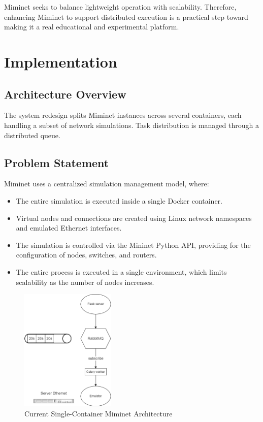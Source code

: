 \documentclass[14pt]{article}
\begin{document}
Miminet\cite{miminet} seeks to balance lightweight operation with scalability. Therefore, enhancing Miminet\cite{miminet} to support distributed execution is a practical step toward making it a real educational and experimental platform.

\section{Implementation}
\subsection{Architecture Overview}
The system redesign splits Miminet\cite{miminet} instances across several containers, each handling a subset of network simulations. Task distribution is managed through a distributed queue.

\subsection{Problem Statement}

Miminet\cite{miminet} uses a centralized simulation management model, where:
\begin{itemize}
    \item The entire simulation is executed inside a single Docker container.
    \item Virtual nodes and connections are created using Linux network namespaces and emulated Ethernet interfaces.
    \item The simulation is controlled via the Mininet\cite{mininet} Python\cite{python} API, providing for the configuration of nodes, switches, and routers.
    \item The entire process is executed in a single environment, which limits scalability as the number of nodes increases.
\end{itemize}

\begin{figure}[h!]
    \centering
    \includegraphics[width=0.4\textwidth]{seq.png}
    \caption{Current Single-Container Miminet Architecture}
\end{figure}
\end{document}
